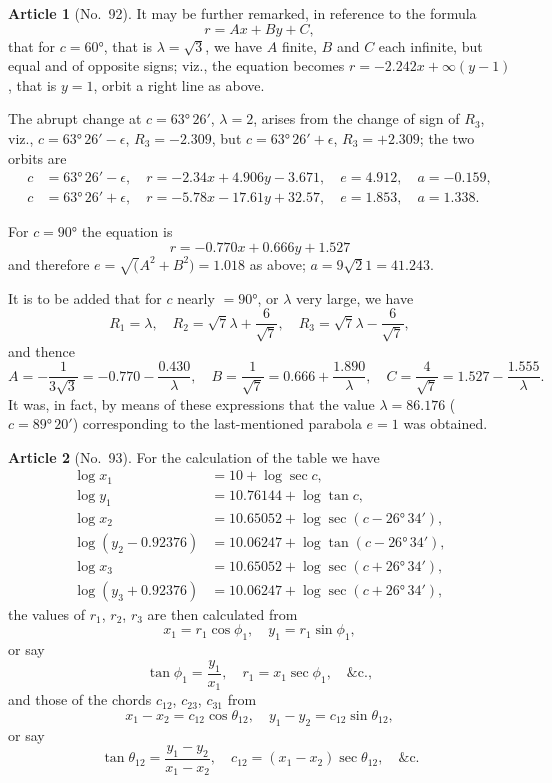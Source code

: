 \documentclass[11pt,a4paper]{article}
\theoremstyle{definition}
\newtheorem{art}{Article}
\begin{document}
\begin{art}[No.~92]
It may be further remarked, in reference to the formula
\[
r = Ax + By + C,
\]
that for $c = 60°$, that is $\lambda = \surd 3$, we have $A$ finite, $B$ and $C$ each infinite, but equal and of opposite signs; viz., the equation becomes $r = -2.242x + \infty(y - 1)$, that is $y = 1$, orbit a right line as above.

The abrupt change at $c = 63°\, 26'$, $\lambda = 2$, arises from the change of sign of $R_3$, viz., $c = 63°\, 26' - \epsilon$, $R_3 = -2.309$, but $c = 63°\, 26' + \epsilon$, $R_3 = +2.309$; the two orbits are
\begin{align*}
c &= 63°\, 26' - \epsilon, \quad r = -2.34x + 4.906y - 3.671, \quad e = 4.912, \quad a = -0.159,\\
c &= 63°\, 26' + \epsilon, \quad r = -5.78x - 17.61y + 32.57, \quad e = 1.853, \quad a = 1.338.
\end{align*}

For $c = 90°$ the equation is
\[
r = -0.770x + 0.666y + 1.527
\]
and therefore $e = \surd(A^2 + B^2) = 1.018$ as above; $a = 9\surd 21 = 41.243$.

It is to be added that for $c$ nearly $= 90°$, or $\lambda$ very large, we have
\[
R_1 = \lambda, \quad R_2 = \surd 7\lambda + \frac{6}{\surd 7}, \quad R_3 = \surd 7\lambda - \frac{6}{\surd 7},
\]
and thence
\[
A = -\frac{1}{3\surd 3} = -0.770 - \frac{0.430}{\lambda}, \quad B = \frac{1}{\surd 7} = 0.666 + \frac{1.890}{\lambda}, \quad C = \frac{4}{\surd 7} = 1.527 - \frac{1.555}{\lambda}.
\]
It was, in fact, by means of these expressions that the value $\lambda = 86.176$ ($c = 89°\, 20'$) corresponding to the last-mentioned parabola $e = 1$ was obtained.
\end{art}

\begin{art}[No.~93]
For the calculation of the table we have
\begin{align*}
\log x_1 &= 10 + \log \sec c,\\
\log y_1 &= 10.76144 + \log \tan c,\\
\log x_2 &= 10.65052 + \log \sec(c - 26°\, 34'),\\
\log(y_2 - 0.92376) &= 10.06247 + \log \tan(c - 26°\, 34'),\\
\log x_3 &= 10.65052 + \log \sec(c + 26°\, 34'),\\
\log(y_3 + 0.92376) &= 10.06247 + \log \sec(c + 26°\, 34'),
\end{align*}
the values of $r_1$, $r_2$, $r_3$ are then calculated from
\[
x_1 = r_1 \cos\phi_1, \quad y_1 = r_1 \sin\phi_1,
\]
or say
\[
\tan\phi_1 = \frac{y_1}{x_1}, \quad r_1 = x_1 \sec\phi_1, \quad \&\text{c.},
\]
and those of the chords $c_{12}$, $c_{23}$, $c_{31}$ from
\[
x_1 - x_2 = c_{12}\cos\theta_{12}, \quad y_1 - y_2 = c_{12}\sin\theta_{12},
\]
or say
\[
\tan\theta_{12} = \frac{y_1 - y_2}{x_1 - x_2}, \quad c_{12} = (x_1 - x_2)\sec\theta_{12}, \quad \&\text{c.}
\]
\end{art}
\end{document}
